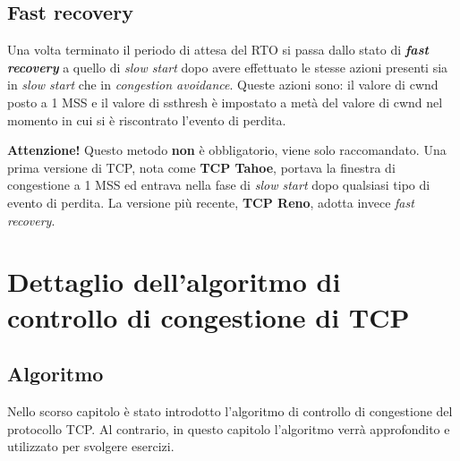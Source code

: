 \documentclass[a4paper]{article}
\begin{document}
	\subsection{Fast recovery}
	
	Una volta terminato il periodo di attesa del RTO si passa dallo stato di \textcolor{Red3}{\textbf{\emph{fast recovery}}} a quello di \emph{slow start} dopo avere effettuato le stesse azioni presenti sia in \emph{slow start} che in \emph{congestion avoidance}. Queste azioni sono: il valore di \textsf{cwnd} posto a 1 MSS e il valore di \textsf{ssthresh} è impostato a metà del valore di \textsf{cwnd} nel momento in cui si è riscontrato l’evento di perdita.\newline
	
	\noindent
	\textbf{Attenzione!} Questo metodo \textbf{non} è obbligatorio, viene solo raccomandato. Una prima versione di TCP, nota come \textbf{TCP Tahoe}, portava la finestra di congestione a 1 MSS ed entrava nella fase di \emph{slow start} dopo qualsiasi tipo di evento di perdita. La versione più recente, \textbf{TCP Reno}, adotta invece \emph{fast recovery}.\newpage
	
	\section{Dettaglio dell'algoritmo di controllo di congestione di TCP}
	
	\subsection{Algoritmo}
	
	Nello scorso capitolo è stato introdotto l'algoritmo di controllo di congestione del protocollo TCP. Al contrario, in questo capitolo l'algoritmo verrà approfondito e utilizzato per svolgere esercizi.\newline
	
\end{document}
